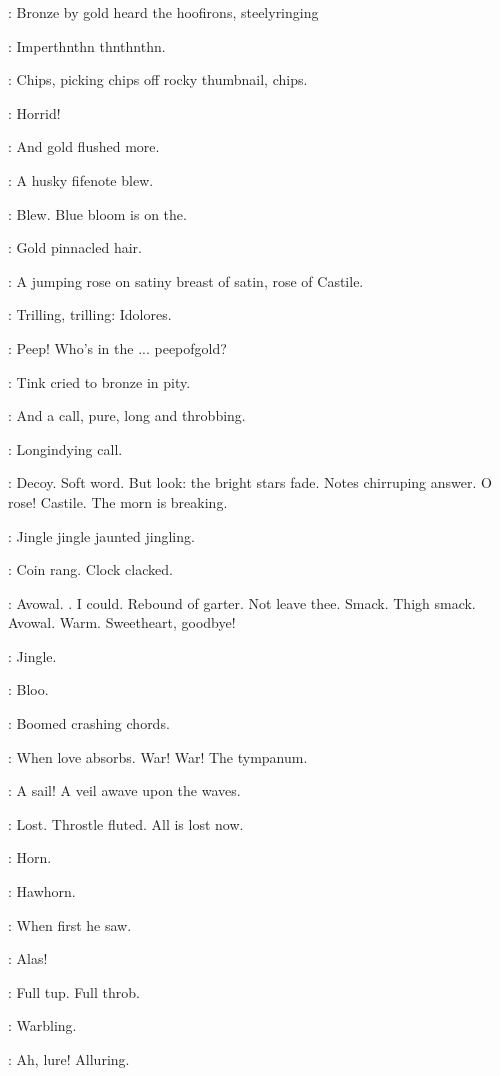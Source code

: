 
:
Bronze by gold heard the hoofirons, steelyringing

:
Imperthnthn thnthnthn.

\simon:
Chips, picking chips off rocky thumbnail, chips.

\MissK:
Horrid!

:
And gold flushed more.

:
A husky fifenote blew.

\BloomInt:
Blew.
Blue bloom is on the.

:
Gold pinnacled hair.

\BloomInt:
A jumping rose on satiny breast of satin, rose of Castile.

\MissD:
Trilling, trilling: Idolores.

\lenehan:
Peep!
Who's in the ...
peepofgold?

:
Tink cried to bronze in pity.

:
And a call, pure, long and throbbing.

\BloomInt:
Longindying call.

\BloomInt:
Decoy.
Soft word.
But look: the bright stars fade.
Notes chirruping answer.
O rose!
Castile.
The morn is breaking.

\boylan:
Jingle jingle jaunted jingling.

\BloomInt:
Coin rang.
Clock clacked.

\BloomInt:
Avowal.
.
I could.
Rebound of garter.
Not leave thee.
Smack.
Thigh smack.
Avowal.
Warm.
Sweetheart, goodbye!

\boylan:
Jingle.

\BloomInt:
Bloo.

:
Boomed crashing chords.

\BloomInt:
When love absorbs.
War! War!
The tympanum.

\BloomInt:
A sail!
A veil awave upon the waves.

\BloomInt:
Lost.
Throstle fluted.
All is lost now.

\BloomInt:
Horn.

:
Hawhorn.

:
When first he saw.

\BloomInt:
Alas!

\BloomInt:
Full tup.
Full throb.

:
Warbling.

\BloomInt:
Ah, lure!
Alluring.

